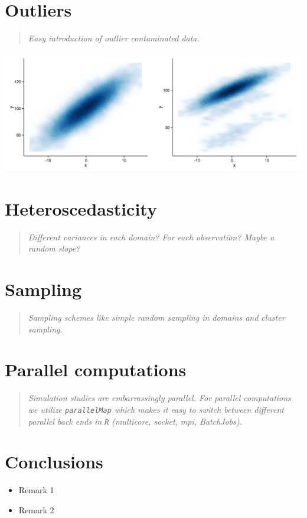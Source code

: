 \documentclass[a0,portrait]{a0poster}\usepackage[]{graphicx}\usepackage[]{color}
\newcommand{\mysec}[1]{\color{Black}\section*{#1}\color{DarkSlateGray}}
\newcommand{\code}[1]{\texttt{#1}}
\newcommand{\inputR}[1]{\small\normalsize}
\begin{document}
\begin{multicols}{2}
\inputR{Rmd/dataGeneration}


\mysec{Outliers}

\begin{verse}
\textit{Easy introduction of outlier contaminated data.}
\end{verse}

\inputR{Rmd/outliers}
\includegraphics[width=\linewidth]{figs/outliers/outliers-1}

\mysec{Heteroscedasticity}

\begin{verse}
\textit{Different variances in each domain? For each observation? Maybe a random slope?}
\end{verse}

\mysec{Sampling}

\begin{verse}
\textit{Sampling schemes like simple random sampling in domains and cluster sampling.}
\end{verse}

\mysec{Parallel computations}

\begin{verse}
\textit{Simulation studies are embarrassingly parallel. For parallel computations we utilize \code{parallelMap} which makes it easy to switch between different parallel back ends in \code{R} (multicore, socket, mpi, BatchJobs).}
\end{verse}



\mysec{Conclusions}
\color{NavyBlue}

\begin{itemize}
  \item Remark 1
  \item Remark 2
\end{itemize}

\color{DarkSlateGray} %


\nocite{*} %

\end{multicols}
\end{document}
